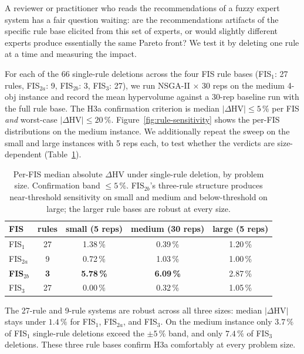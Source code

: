 \documentclass[applsci,article,submit,moreauthors,pdftex]{Definitions/mdpi}
\begin{document}
A reviewer or practitioner who reads the recommendations of a fuzzy expert
system has a fair question waiting: are the recommendations artifacts of
the specific rule base elicited from this set of experts, or would slightly
different experts produce essentially the same Pareto front? We test it by
deleting one rule at a time and measuring the impact.

For each of the 66 single-rule deletions across the four FIS rule bases
(FIS$_1$: 27 rules, FIS$_{2a}$: 9, FIS$_{2b}$: 3, FIS$_3$: 27), we run
NSGA-II $\times$ 30 reps on the medium 4-obj instance and record the mean
hypervolume against a 30-rep baseline run with the full rule base. The
H3a confirmation criterion is median $|\Delta\mathrm{HV}| \le 5\,\%$ per
FIS \emph{and} worst-case $|\Delta\mathrm{HV}| \le 20\,\%$.
Figure~\ref{fig:rule-sensitivity} shows the per-FIS distributions on
the medium instance. We additionally repeat the sweep on the small and
large instances with 5 reps each, to test whether the verdicts are
size-dependent (Table~\ref{tab:h3a-by-size}).

\begin{table}[!t]
\centering
\caption{Per-FIS median absolute $\Delta\mathrm{HV}$ under single-rule
deletion, by problem size. Confirmation band $\le 5\,\%$. FIS$_{2b}$'s
three-rule structure produces near-threshold sensitivity on small and
medium and below-threshold on large; the larger rule bases are robust
at every size.}
\label{tab:h3a-by-size}
\small
\begin{tabular}{l c c c c}
\toprule
FIS & rules & small (5 reps) & medium (30 reps) & large (5 reps) \\
\midrule
FIS$_1$       & 27 & 1.38\,\% & 0.39\,\% & 1.20\,\% \\
FIS$_{2a}$    & 9  & 0.72\,\% & 1.03\,\% & 1.00\,\% \\
\textbf{FIS$_{2b}$}  & \textbf{3}  & \textbf{5.78\,\%} & \textbf{6.09\,\%} & 2.87\,\% \\
FIS$_3$       & 27 & 0.00\,\% & 0.32\,\% & 1.05\,\% \\
\bottomrule
\end{tabular}
\end{table}

The 27-rule and 9-rule systems are robust across all three sizes: median
$|\Delta\mathrm{HV}|$ stays under $1.4\,\%$ for FIS$_1$, FIS$_{2a}$, and
FIS$_3$. On the medium instance only $3.7\,\%$ of FIS$_1$ single-rule
deletions exceed the $\pm 5\,\%$ band, and only $7.4\,\%$ of FIS$_3$
deletions. These three rule bases confirm H3a comfortably at every
problem size.
\end{document}
